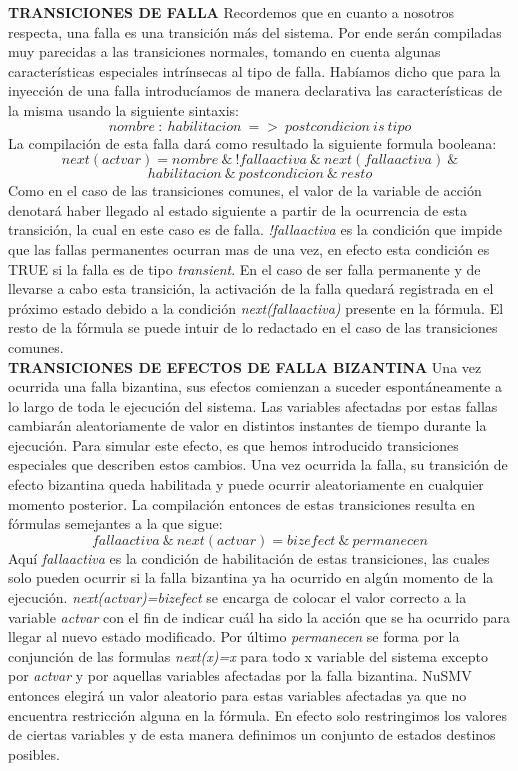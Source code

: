 \documentclass[titlepage, 12pt]{book}
\begin{document}
\textbf{TRANSICIONES DE FALLA}
Recordemos que en cuanto a nosotros respecta, una falla es una transici\'on m\'as del sistema. Por ende ser\'an compiladas muy parecidas a las transiciones normales, tomando en cuenta algunas caracter\'isticas especiales intr\'insecas al tipo de falla. Hab\'iamos dicho que para la inyecci\'on de una falla introduc\'iamos de manera declarativa las caracter\'isticas de la misma usando la siguiente sintaxis:
$$nombre~:~habilitacion~=>~postcondicion~is~tipo$$
La compilaci\'on de esta falla dar\'a como resultado la siguiente formula booleana:
$$next(actvar)=nombre~\&~!fallaactiva~\&~next(fallaactiva)~\&$$ $$habilitacion~\&~postcondicion~\&~resto$$
Como en el caso de las transiciones comunes, el valor de la variable de acci\'on denotar\'a haber llegado al estado siguiente a partir de la ocurrencia de esta transici\'on, la cual en este caso es de falla. \textit{!fallaactiva} es la condici\'on que impide que las fallas permanentes ocurran mas de una vez, en efecto esta condici\'on es TRUE si la falla es de tipo \textit{transient}. En el caso de ser falla permanente y de llevarse a cabo esta transici\'on, la activaci\'on de la falla quedar\'a registrada en el pr\'oximo estado debido a la condici\'on \textit{next(fallaactiva)} presente en la f\'ormula. El resto de la f\'ormula se puede intuir de lo redactado en el caso de las transiciones comunes.\\


\textbf{TRANSICIONES DE EFECTOS DE FALLA BIZANTINA}
Una vez ocurrida una falla bizantina, sus efectos comienzan a suceder espont\'aneamente a lo largo de toda le ejecuci\'on del sistema. Las variables afectadas por estas fallas cambiar\'an aleatoriamente de valor en distintos instantes de tiempo durante la ejecuci\'on. Para simular este efecto, es que hemos introducido transiciones especiales que describen estos cambios. Una vez ocurrida la falla, su transici\'on de efecto bizantina queda habilitada y puede ocurrir aleatoriamente en cualquier momento posterior. La compilaci\'on entonces de estas transiciones resulta en f\'ormulas semejantes a la que sigue:
$$fallaactiva~\&~next(actvar)=bizefect~\&~permanecen$$
Aqu\'i \textit{fallaactiva} es la condici\'on de habilitaci\'on de estas transiciones, las cuales solo pueden ocurrir si la falla bizantina ya ha ocurrido en alg\'un momento de la ejecuci\'on. \textit{next(actvar)=bizefect} se encarga de colocar el valor correcto a la variable \textit{actvar} con el fin de indicar cu\'al ha sido la acci\'on que se ha ocurrido para llegar al nuevo estado modificado. Por \'ultimo \textit{permanecen} se forma por la conjunci\'on de las formulas \textit{next(x)=x} para todo x variable del sistema excepto por \textit{actvar} y por aquellas variables afectadas por la falla bizantina. NuSMV entonces elegir\'a un valor aleatorio para estas variables afectadas ya que no encuentra restricci\'on alguna en la f\'ormula. En efecto solo restringimos los valores de ciertas variables y de esta manera definimos un conjunto de estados destinos posibles.\\
\end{document}
